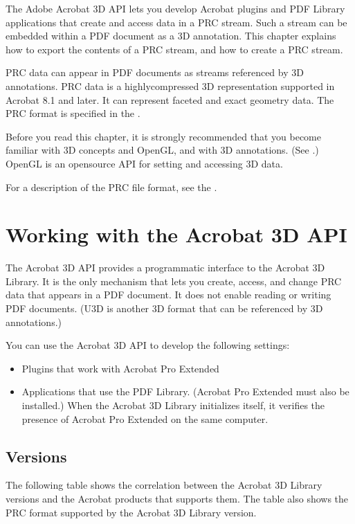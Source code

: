 \documentclass[letterpaper,12pt,english,openany,oneside]{sphinxmanual}
\begin{document}
The Adobe Acrobat 3D API lets you develop Acrobat plugins and PDF Library applications that create and access data in a PRC stream. Such a stream can be embedded within a PDF document as a 3D annotation. This chapter explains how to export the contents of a PRC stream, and how to create a PRC stream.

PRC data can appear in PDF documents as streams referenced by 3D annotations. PRC data is a highly\sphinxhyphen{}compressed 3D representation supported in Acrobat 8.1 and later. It can represent faceted and exact geometry data. The PRC format is specified in the .

Before you read this chapter, it is strongly recommended that you become familiar with 3D concepts and OpenGL, and with 3D annotations. (See .) OpenGL is an open\sphinxhyphen{}source API for setting and accessing 3D data.

For a description of the PRC file format, see the .


\section{Working with the Acrobat 3D API}
\label{\detokenize{Plugins_A3D_API:working-with-the-acrobat-3d-api}}
The Acrobat 3D API provides a programmatic interface to the Acrobat 3D Library. It is the only mechanism that lets you create, access, and change PRC data that appears in a PDF document. It does not enable reading or writing PDF documents. (U3D is another 3D format that can be referenced by 3D annotations.)

You can use the Acrobat 3D API to develop the following settings:
\begin{itemize}
\item {} 
Plugins that work with Acrobat Pro Extended

\item {} 
Applications that use the PDF Library. (Acrobat Pro Extended must also be installed.) When the Acrobat 3D Library initializes itself, it verifies the presence of Acrobat Pro Extended on the same computer.

\end{itemize}


\subsection{Versions}
\label{\detokenize{Plugins_A3D_API:versions}}
The following table shows the correlation between the Acrobat 3D Library versions and the Acrobat products that supports them. The table also shows the PRC format supported by the Acrobat 3D Library version.
\end{document}
